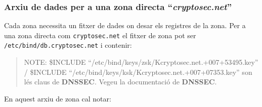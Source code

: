\documentclass[]{article}
\newenvironment{Shaded}{}{}
\newcommand{\ExtensionTok}[1]{#1}
\newcommand{\KeywordTok}[1]{\textcolor[rgb]{0.00,0.44,0.13}{\textbf{#1}}}
\newcommand{\NormalTok}[1]{#1}
\newcommand{\StringTok}[1]{\textcolor[rgb]{0.25,0.44,0.63}{#1}}
\newcommand{\VariableTok}[1]{\textcolor[rgb]{0.10,0.09,0.49}{#1}}
\begin{document}
\hypertarget{arxiu-de-dades-per-a-una-zona-directa-cryptosec.net}{%
\subsubsection{\texorpdfstring{\textbf{Arxiu de dades per a una zona
directa
``\emph{cryptosec.net}''}}{Arxiu de dades per a una zona directa ``cryptosec.net''}}\label{arxiu-de-dades-per-a-una-zona-directa-cryptosec.net}}

Cada zona necessita un fitxer de dades on desar els registres de la
zona. Per a una zona directa com \texttt{cryptosec.net} el fitxer de
zona pot ser \texttt{/etc/bind/db.cryptosec.net} i contenir:

\begin{Shaded}
\end{Shaded}

\begin{quote}
NOTE: \$INCLUDE ``/etc/bind/keys/zsk/Kcryptosec.net.+007+53495.key'' /
\$INCLUDE ``/etc/bind/keys/ksk/Kcryptosec.net.+007+07353.key'' son lés
claus de \textbf{DNSSEC}. Vegeu la documentació de \textbf{DNSSEC}.
\end{quote}

En aquest arxiu de zona cal notar:
\end{document}
